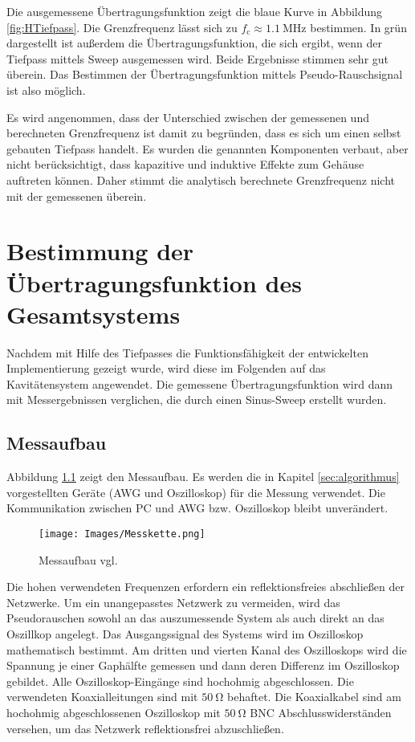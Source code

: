 \documentclass[12pt,report,final,twoside,accentcolor=tud9b,bigchapter]{tudreport}
\begin{document}
Die ausgemessene Übertragungsfunktion zeigt die blaue Kurve in Abbildung \ref{fig:HTiefpass}. Die Grenzfrequenz lässt sich zu $f_\textrm{c}\approx \SI{1.1}{\mega\hertz}$ bestimmen. In grün dargestellt ist außerdem die Übertragungsfunktion, die sich ergibt, wenn der Tiefpass mittels Sweep ausgemessen wird. Beide Ergebnisse stimmen sehr gut überein. Das Bestimmen der Übertragungsfunktion mittels Pseudo-Rauschsignal ist also möglich.

Es wird angenommen, dass der Unterschied zwischen der gemessenen und berechneten Grenzfrequenz ist damit zu begründen, dass es sich um einen selbst gebauten Tiefpass handelt. Es wurden die genannten Komponenten verbaut, aber nicht berücksichtigt, dass kapazitive und induktive Effekte zum Gehäuse auftreten können. Daher stimmt die analytisch berechnete Grenzfrequenz nicht mit der gemessenen überein.

\chapter{Bestimmung der Übertragungsfunktion des Gesamtsystems}
Nachdem mit Hilfe des Tiefpasses die Funktionsfähigkeit der entwickelten Implementierung gezeigt wurde, wird diese im Folgenden auf das Kavitätensystem angewendet. Die gemessene Übertragungsfunktion wird dann mit Messergebnissen verglichen, die durch einen Sinus-Sweep erstellt wurden. 

\section{Messaufbau} 
Abbildung \ref{fig:Messkette} zeigt den Messaufbau. Es werden die in Kapitel \ref{sec:algorithmus} vorgestellten Geräte (AWG und Oszilloskop) für die Messung verwendet. Die Kommunikation zwischen PC und AWG bzw. Oszilloskop bleibt unverändert. 

\begin{figure}[h!]   
 
  \centering
     \texttt{[image: Images/Messkette.png]}
     \caption{Messaufbau vgl. \citep{IPAC}}
     \label{fig:Messkette}
     
\end{figure}

Die hohen verwendeten Frequenzen erfordern ein reflektionsfreies abschließen der Netzwerke. Um ein unangepasstes Netzwerk zu vermeiden, wird das Pseudorauschen sowohl an das auszumessende System als auch direkt an das Oszillkop angelegt. Das Ausgangssignal des Systems wird im Oszilloskop mathematisch bestimmt. Am dritten und vierten Kanal des Oszilloskops wird die Spannung je einer Gaphälfte gemessen und dann deren Differenz im Oszilloskop gebildet. Alle Oszilloskop-Eingänge sind hochohmig abgeschlossen.
Die verwendeten Koaxialleitungen sind mit $\SI{50}{\ohm}$ behaftet.
Die Koaxialkabel sind am hochohmig abgeschlossenen Oszilloskop mit $\SI{50}{\ohm}$ BNC Abschlusswiderständen versehen, um das Netzwerk reflektionsfrei abzuschließen.
\end{document}
